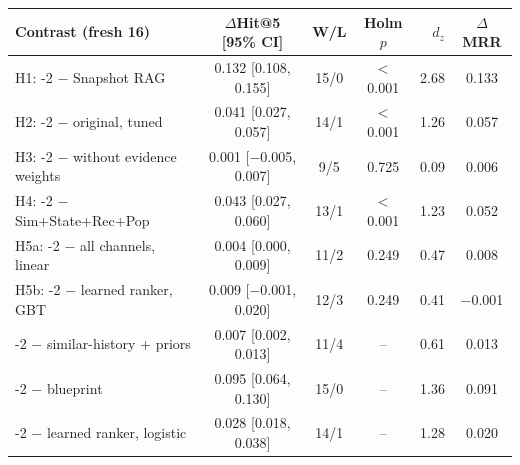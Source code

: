 \begin{tabular}{l@{\hspace{4pt}}cccrc}
\toprule
Contrast (fresh 16) & $\Delta$Hit@5 [95\% CI] & W/L & Holm $p$ & $d_z$ & $\Delta$MRR \\
\midrule
H1: \sys{}-2 $-$ Snapshot RAG & 0.132 [0.108, 0.155] & 15/0 & $<$0.001 & 2.68 & 0.133 \\
H2: \sys{}-2 $-$ original, tuned & 0.041 [0.027, 0.057] & 14/1 & $<$0.001 & 1.26 & 0.057 \\
H3: \sys{}-2 $-$ without evidence weights & 0.001 [$-$0.005, 0.007] & 9/5 & 0.725 & 0.09 & 0.006 \\
H4: \sys{}-2 $-$ Sim+State+Rec+Pop & 0.043 [0.027, 0.060] & 13/1 & $<$0.001 & 1.23 & 0.052 \\
H5a: \sys{}-2 $-$ all channels, linear & 0.004 [0.000, 0.009] & 11/2 & 0.249 & 0.47 & 0.008 \\
H5b: \sys{}-2 $-$ learned ranker, GBT & 0.009 [$-$0.001, 0.020] & 12/3 & 0.249 & 0.41 & $-$0.001 \\
\midrule
\sys{}-2 $-$ similar-history + priors & 0.007 [0.002, 0.013] & 11/4 & -- & 0.61 & 0.013 \\
\sys{}-2 $-$ blueprint & 0.095 [0.064, 0.130] & 15/0 & -- & 1.36 & 0.091 \\
\sys{}-2 $-$ learned ranker, logistic & 0.028 [0.018, 0.038] & 14/1 & -- & 1.28 & 0.020 \\
\bottomrule
\end{tabular}